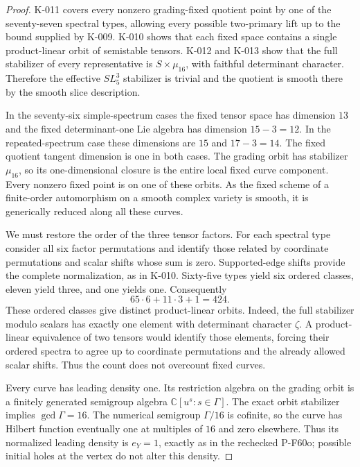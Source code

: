 \begin{proof}
K-011 covers every nonzero grading-fixed quotient point by one of
the seventy-seven spectral types, allowing every possible
two-primary lift up to the bound supplied by K-009.  K-010 shows
that each fixed space contains a single product-linear orbit of
semistable tensors.  K-012 and K-013 show that the full stabilizer
of every representative is $S\times\mu_{16}$, with faithful
determinant character.  Therefore the effective $SL_5^3$ stabilizer
is trivial and the quotient is smooth there by the smooth slice
description.

In the seventy-six simple-spectrum cases the fixed tensor space
has dimension $13$ and the fixed determinant-one Lie algebra has
dimension $15-3=12$.  In the repeated-spectrum case these dimensions
are $15$ and $17-3=14$.  The fixed quotient tangent dimension is one
in both cases.  The grading orbit has stabilizer $\mu_{16}$, so its
one-dimensional closure is the entire local fixed curve component.
Every nonzero fixed point is on one of these orbits.  As the fixed
scheme of a finite-order automorphism on a smooth complex variety
is smooth, it is generically reduced along all these curves.

We must restore the order of the three tensor factors.  For each
spectral type consider all six factor permutations and identify
those related by coordinate permutations and scalar shifts whose
sum is zero.  Supported-edge shifts provide the complete
normalization, as in K-010.  Sixty-five types yield six ordered
classes, eleven yield three, and one yields one.  Consequently
\[
                        65\cdot6+11\cdot3+1=424.             \tag{K-014b}
\]
These ordered classes give distinct product-linear orbits.
Indeed, the full stabilizer modulo scalars has exactly one element
with determinant character $\zeta$.  A product-linear equivalence
of two tensors would identify those elements, forcing their ordered
spectra to agree up to coordinate permutations and the already
allowed scalar shifts.  Thus the count does not overcount fixed
curves.

Every curve has leading density one.  Its restriction algebra on
the grading orbit is a finitely generated semigroup algebra
$\mathbb C[u^s:s\in\Gamma]$.  The exact orbit stabilizer implies
$\gcd\Gamma=16$.  The numerical semigroup $\Gamma/16$ is cofinite,
so the curve has Hilbert function eventually one at multiples of
$16$ and zero elsewhere.  Thus its normalized leading density is
$e_Y=1$, exactly as in the rechecked P-F60o; possible initial holes
at the vertex do not alter this density.


\end{proof}

